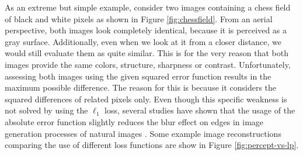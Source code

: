 As an extreme but simple example, consider two images containing a chess field of black and white pixels as shown in Figure \ref{fig:chessfield}. From an aerial perspective, both images look completely identical, because it is perceived as a gray surface. Additionally, even when we look at it from a closer distance, we would still evaluate them as quite similar. This is for the very reason that both images provide the same colors, structure, sharpness or contrast. Unfortunately, assessing both images using the given squared error function results in the maximum possible difference. The reason for this is because it considers the squared differences of related pixels only. Even though this specific weakness is not solved by using the $ \ell_{1} $ loss, several studies have shown that the usage of the absolute error function slightly reduces the blur effect on edges in image generation processes of natural images \parencite{loss-func-img-proc} \parencite{deep_multiscale_video_pred}. Some example image reconstructions comparing the use of different loss functions are show in Figure \ref{fig:percept-vs-lp}.

